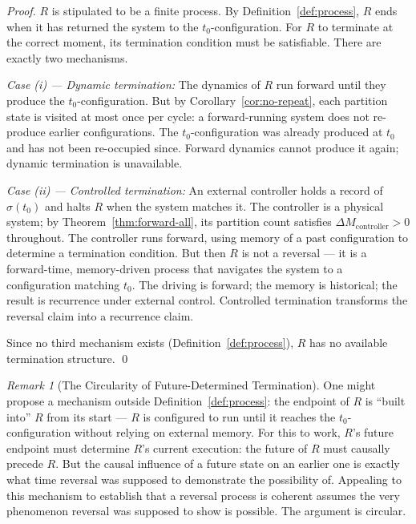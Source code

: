 \documentclass[twocolumn,10pt,a4paper]{article}
\theoremstyle{thmstyle}
\theoremstyle{definition}
\theoremstyle{remark}
\newtheorem{remark}[theorem]{Remark}
\begin{document}
\begin{proof}
$R$ is stipulated to be a finite process. By Definition~\ref{def:process}, $R$ ends when it has returned the system to the $t_0$-configuration. For $R$ to terminate at the correct moment, its termination condition must be satisfiable. There are exactly two mechanisms.

\textit{Case (i) --- Dynamic termination:} The dynamics of $R$ run forward until they produce the $t_0$-configuration. But by Corollary~\ref{cor:no-repeat}, each partition state is visited at most once per cycle: a forward-running system does not re-produce earlier configurations. The $t_0$-configuration was already produced at $t_0$ and has not been re-occupied since. Forward dynamics cannot produce it again; dynamic termination is unavailable.

\textit{Case (ii) --- Controlled termination:} An external controller holds a record of $\sigma(t_0)$ and halts $R$ when the system matches it. The controller is a physical system; by Theorem~\ref{thm:forward-all}, its partition count satisfies $\Delta M_{\mathrm{controller}} > 0$ throughout. The controller runs forward, using memory of a past configuration to determine a termination condition. But then $R$ is not a reversal --- it is a forward-time, memory-driven process that navigates the system to a configuration matching $t_0$. The driving is forward; the memory is historical; the result is recurrence under external control. Controlled termination transforms the reversal claim into a recurrence claim.

Since no third mechanism exists (Definition~\ref{def:process}), $R$ has no available termination structure. \qed
\end{proof}

\begin{remark}[The Circularity of Future-Determined Termination]
\label{rem:circular-reversal}
One might propose a mechanism outside Definition~\ref{def:process}: the endpoint of $R$ is ``built into'' $R$ from its start --- $R$ is configured to run until it reaches the $t_0$-configuration without relying on external memory. For this to work, $R$'s future endpoint must determine $R$'s current execution: the future of $R$ must causally precede $R$. But the causal influence of a future state on an earlier one is exactly what time reversal was supposed to demonstrate the possibility of. Appealing to this mechanism to establish that a reversal process is coherent assumes the very phenomenon reversal was supposed to show is possible. The argument is circular.
\end{remark}
\end{document}
